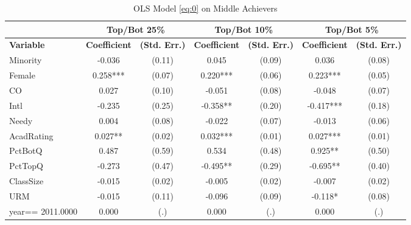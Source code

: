 \begin{sidewaystable}[htb]\centering
  \begin{threeparttable}
    \caption{OLS Model \eqref{eq:0} on Middle Achievers}\label{table:c1}
    \begin{tabular}{l|c|c|c|c|c|c}
      \hline\hline 
                        & \multicolumn{2}{|c|}{Top/Bot 25\%} & \multicolumn{2}{|c|}{Top/Bot 10\%} & \multicolumn{2}{|c}{Top/Bot 5\%}                                                               \\
      \hline
      \textbf{Variable} & \textbf{Coefficient}         & \textbf{(Std. Err.)}         & \textbf{Coefficient} & \textbf{(Std. Err.)} & \textbf{Coefficient} & \textbf{(Std. Err.)} \\ 
      \hline
      \hline 
      Minority          & -0.036                   & (0.11)                    & 0.045     & (0.09) & 0.036     & (0.08) \\
      Female            & 0.258***                 & (0.07)                    & 0.220***  & (0.06) & 0.223***  & (0.05) \\
      CO                & 0.027                    & (0.10)                    & -0.051    & (0.08) & -0.048    & (0.07) \\
      Intl              & -0.235                   & (0.25)                    & -0.358**  & (0.20) & -0.417*** & (0.18) \\
      Needy             & 0.004                    & (0.08)                    & -0.022    & (0.07) & -0.013    & (0.06) \\
      AcadRating        & 0.027**                  & (0.02)                    & 0.032***  & (0.01) & 0.027***  & (0.01) \\
      PctBotQ           & 0.487                    & (0.59)                    & 0.534     & (0.48) & 0.925**   & (0.50) \\
      PctTopQ           & -0.273                   & (0.47)                    & -0.495**  & (0.29) & -0.695**  & (0.40) \\
      ClassSize         & -0.015                   & (0.02)                    & -0.005    & (0.02) & -0.007    & (0.02) \\
      URM               & -0.015                   & (0.11)                    & -0.096    & (0.09) & -0.118*   & (0.08) \\
      year==  2011.0000 & 0.000                    & (.)                       & 0.000     & (.)    & 0.000     & (.)    \\

\end{tabular}
\end{threeparttable}
\end{sidewaystable}
